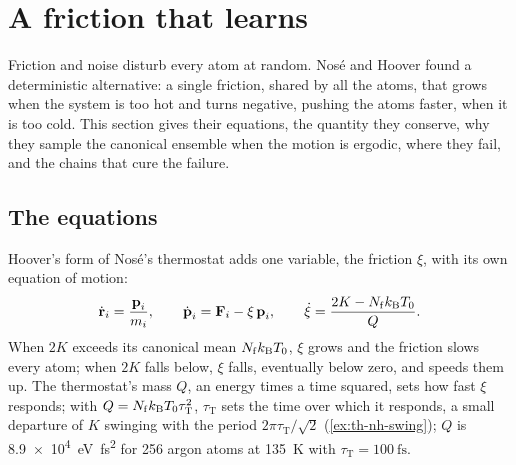 \section{A friction that learns}
\label{sec:th-nose}

Friction and noise disturb every atom at random. Nosé and Hoover found a
deterministic alternative: a single friction, shared by all the atoms,
that grows when the system is too hot and turns negative, pushing the
atoms faster, when it is too cold. This section gives their equations,
the quantity they conserve, why they sample the canonical ensemble when
the motion is ergodic, where they fail, and the chains that cure the
failure.

\subsection*{The equations}

Hoover's form of Nosé's thermostat adds one variable, the friction $\xi$,
with its own equation of motion\cite{Nose1984,Hoover1985}:
\begin{equation}
   \dot{\bm{\mathrm{r}}}_i = \frac{\bm{\mathrm{p}}_i}{m_i} , \qquad
   \dot{\bm{\mathrm{p}}}_i = \bm{\mathrm{F}}_i - \xi\,\bm{\mathrm{p}}_i , \qquad
   \dot\xi = \frac{2K - N_{\mathrm f}k_{\mathrm{B}} T_0}{Q} .
   \label{eq:th-nh}
\end{equation}
When $2K$ exceeds its canonical mean $N_{\mathrm f}k_{\mathrm{B}} T_0$, $\xi$ grows and
the friction slows every atom; when $2K$ falls below, $\xi$ falls,
eventually below zero, and speeds them up. The thermostat's mass $Q$, an
energy times a time squared, sets how fast $\xi$ responds; with $Q =
N_{\mathrm f}k_{\mathrm{B}} T_0\tau_{\mathrm T}^2$, $\tau_{\mathrm T}$ sets the time
over which it responds, a small departure of $K$ swinging with the period
$2\pi\tau_{\mathrm T}/\sqrt2$ (\cref{ex:th-nh-swing}); $Q$ is
\SI{8.9e4}{\electronvolt\femto\second\squared} for 256 argon atoms at
\SI{135}{\kelvin} with $\tau_{\mathrm T} = \SI{100}{\femto\second}$.

